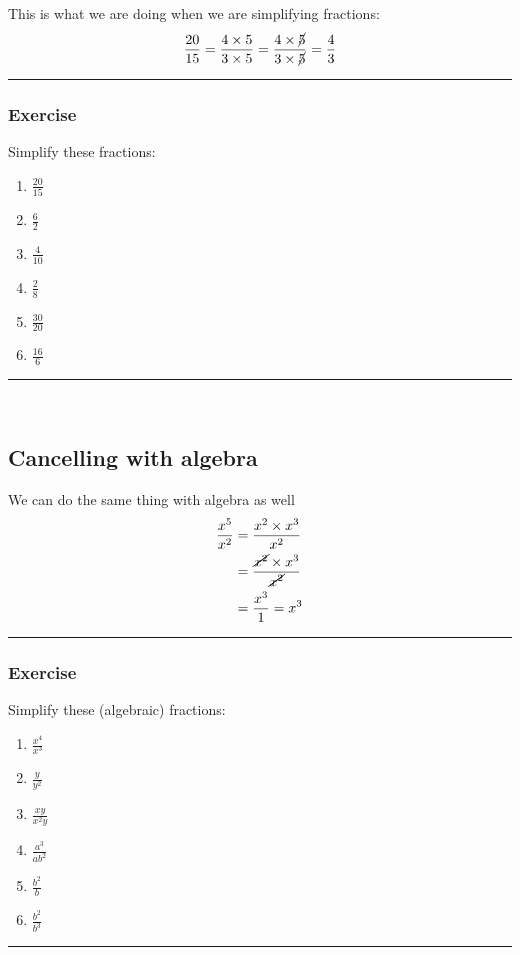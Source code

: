 \documentclass[a4paper,12pt]{article}
\newcommand\question{
	 \rule[0pt]{17cm}{0.5pt}\vspace{-0.5cm}
	\subsubsection{Exercise}

}
\newcommand\questionend{
	\rule[0pt]{17cm}{0.5pt}\vspace{0.0cm}\\
}
\begin{document}
This is what we are doing when we are simplifying fractions:
\begin{align*}
\frac{20}{15} = \frac{4 \times 5}{ 3 \times 5 } = \frac{4 \times \cancel{5} }{ 3 \times \cancel{5} } = \frac{4}{3}
\end{align*}
\question
Simplify these fractions:
\begin{multicols}{3}
	\begin{enumerate}[label=\normalsize \alph*)~~~ , topsep=8pt,itemsep=25pt,partopsep=4pt, parsep=4pt]
		\item $\displaystyle \frac{20}{15}$
		\item $\displaystyle \frac{6}{2}$
		\item $\displaystyle \frac{4}{10}$
		\item $\displaystyle \frac{2}{8}$
		\item $\displaystyle \frac{30}{20}$
		\item $\displaystyle \frac{16}{6}$
	\end{enumerate}
\end{multicols}
\questionend \vspace{-1cm}
\subsection{Cancelling with algebra}
We can do the same thing with algebra as well
\begin{align*}
\frac{x^5}{x^2} &= \frac{x^2 \times x^3 }{x^2}\\
&=  \frac{\cancel{x^2} \times x^3 }{ \cancel{x^2} }\\
&=  \frac{x^3 }{ 1 } = x^3
\end{align*}
\question
Simplify these (algebraic) fractions:
\begin{multicols}{3}
	\begin{enumerate}[label=\normalsize \alph*)~~~ , topsep=8pt,itemsep=25pt,partopsep=4pt, parsep=4pt]
		\item $\displaystyle \frac{x^4}{x^3}$
		\item $\displaystyle \frac{y}{y^2}$
		\item $\displaystyle \frac{xy}{x^2y}$
		\item $\displaystyle \frac{a^3}{ab^2}$
		\item $\displaystyle \frac{b^2}{b}$
		\item $\displaystyle \frac{b^2}{b^3}$
	\end{enumerate}
\end{multicols}
\questionend
\end{document}
